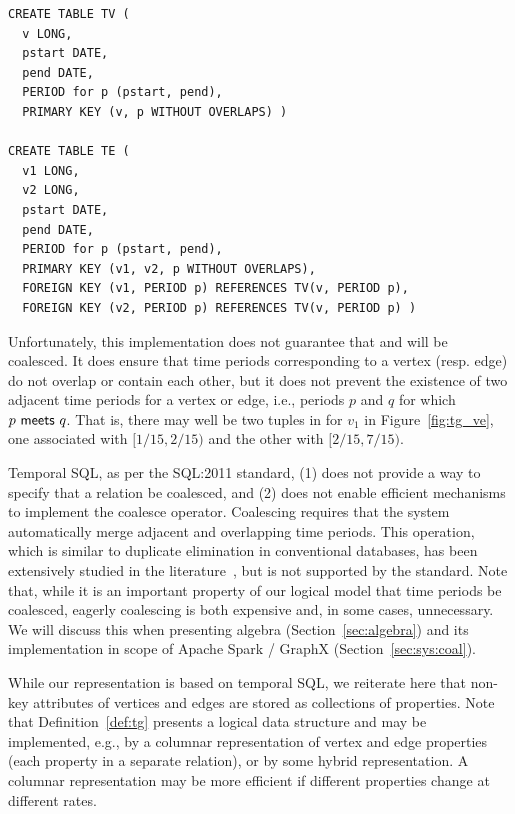 \begin{small}
\begin{verbatim}
CREATE TABLE TV (
  v LONG,
  pstart DATE,
  pend DATE,
  PERIOD for p (pstart, pend),
  PRIMARY KEY (v, p WITHOUT OVERLAPS) )

CREATE TABLE TE (
  v1 LONG,
  v2 LONG,
  pstart DATE,
  pend DATE,
  PERIOD for p (pstart, pend),
  PRIMARY KEY (v1, v2, p WITHOUT OVERLAPS),
  FOREIGN KEY (v1, PERIOD p) REFERENCES TV(v, PERIOD p),
  FOREIGN KEY (v2, PERIOD p) REFERENCES TV(v, PERIOD p) )
\end{verbatim}
\end{small}

Unfortunately, this implementation does not guarantee that \tv and \te
will be coalesced.  It does ensure that time periods corresponding to
a vertex (resp. edge) do not overlap or contain each other, but it
does not prevent the existence of two adjacent time periods for a
vertex or edge, i.e., periods $p$ and $q$ for which
$p~\mathsf{meets}~q$.  That is, there may well be two tuples in \tv
for $v_1$ in Figure~\ref{fig:tg_ve}, one associated with $[1/15,
  2/15)$ and the other with $[2/15, 7/15)$.

Temporal SQL, as per the SQL:2011 standard, (1) does not provide a way
to specify that a relation be coalesced, and (2) does not enable
efficient mechanisms to implement the coalesce operator.  Coalescing
requires that the system automatically merge adjacent and overlapping
time periods.  This operation, which is similar to duplicate
elimination in conventional databases, has been extensively studied in
the
literature~\cite{DBLP:conf/vldb/BohlenSS96,DBLP:journals/sigmod/Zimanyi06},
but is not supported by the standard.  Note that, while it is an
important property of our logical model that time periods be
coalesced, eagerly coalescing is both expensive and, in some cases,
unnecessary.  We will discuss this when presenting \tg algebra
(Section~\ref{sec:algebra}) and its implementation in scope of Apache
Spark / GraphX (Section~\ref{sec:sys:coal}).

While our \ve representation is based on temporal SQL, we reiterate
here that non-key attributes of vertices and edges are stored as
collections of properties.  Note that Definition~\ref{def:tg} presents
a logical data structure and may be implemented, e.g., by a columnar
representation of vertex and edge properties (each property in a
separate relation), or by some hybrid representation.  A columnar
representation may be more efficient if different properties change at
different rates.


